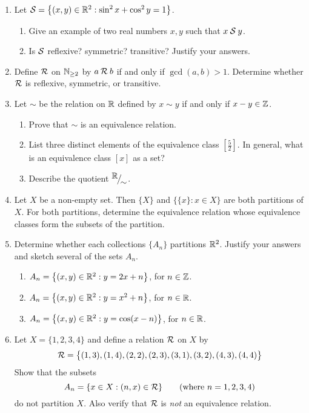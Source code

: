 \begin{enumerate}
	\item Let $\mathcal{S}=\bigl\{(x,y)\in\mathbb{R}^2:\sin^2x+\cos^2y=1\bigr\}$.
	\begin{enumerate}
	  \item Give an example of two real numbers $x,y$ such that $x\mathbin{\mathcal{S}}y$.
	  \item Is $\mathcal{S}$ reflexive? symmetric? transitive? Justify your answers.
	\end{enumerate}
  
  
	\item Define $\mathcal{R}$ on $\mathbb{N}_{\ge 2}$ by $a\mathbin{\mathcal{R}} b$ if and only if $\gcd(a,b) > 1$. Determine whether $\mathcal{R}$ is reflexive, symmetric, or transitive. 


	\item Let $\sim$ be the relation on $\mathbb{R}$ defined by $x \sim y$ if and only if $x - y \in \mathbb{Z}$.
	\begin{enumerate}
    \item Prove that $\sim$ is an equivalence relation.
    \item List three distinct elements of the equivalence class $[\frac 52]$. In general, what is an equivalence class $[x]$ as a set?
    \item Describe the quotient ${}^{\textstyle {\mathbb{R}}}\!\big/_{\textstyle \!{\sim}}$.
	\end{enumerate}


	\item Let $X$ be a non-empty set. Then $\{X\}$ and $\bigl\{\{x\} : x \in X\bigr\}$ are both partitions of $X$. For both partitions, determine the equivalence relation whose equivalence classes form the subsets of the partition.


	\item Determine whether each collections $\{A_n\}$ partitions $\mathbb{R}^2$. Justify your answers and sketch several of the sets $A_n$.
	\begin{enumerate}
		\item $A_n=\bigl\{(x,y)\in\mathbb{R}^2:y=2x+n\bigr\}$, for $n\in\mathbb{Z}$.
	  \item $A_n=\bigl\{(x,y)\in\mathbb{R}^2:y=x^2+n\bigr\}$, for $n\in\mathbb{R}$.
	  \item $A_n=\bigl\{(x,y)\in\mathbb{R}^2:y=\cos(x-n)\bigr\}$, for $n\in\mathbb{R}$.
	\end{enumerate}
	
	
	\item Let $X=\{1,2,3,4\}$ and define a relation $\mathcal{R}$ on $X$ by
	\[
		\mathcal{R}=\bigl\{(1,3),(1,4),(2,2),(2,3),(3,1),(3,2),(4,3),(4,4)\bigr\}
	\]
	Show that the subsets
	\[
		A_n=\{x\in X:(n,x)\in\mathcal{R}\} \tag{where $n=1,2,3,4$}
	\]
	do not partition $X$. Also verify that $\mathcal{R}$ is \emph{not} an equivalence relation.
\end{enumerate}

